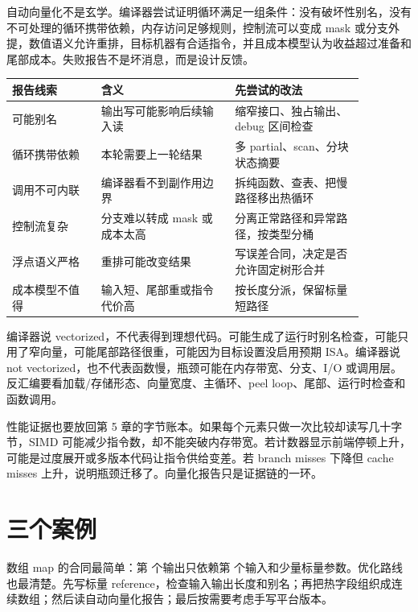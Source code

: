自动向量化不是玄学。编译器尝试证明循环满足一组条件：没有破坏性别名，没有不可处理的循环携带依赖，内存访问足够规则，控制流可以变成 mask 或分支外提，数值语义允许重排，目标机器有合适指令，并且成本模型认为收益超过准备和尾部成本。失败报告不是坏消息，而是设计反馈。

\begin{center}
\begin{tabular}{p{0.22\linewidth}p{0.33\linewidth}p{0.32\linewidth}}
\toprule
报告线索 & 含义 & 先尝试的改法 \\
\midrule
可能别名 & 输出写可能影响后续输入读 & 缩窄接口、独占输出、debug 区间检查 \\
循环携带依赖 & 本轮需要上一轮结果 & 多 partial、scan、分块状态摘要 \\
调用不可内联 & 编译器看不到副作用边界 & 拆纯函数、查表、把慢路径移出热循环 \\
控制流复杂 & 分支难以转成 mask 或成本太高 & 分离正常路径和异常路径，按类型分桶 \\
浮点语义严格 & 重排可能改变结果 & 写误差合同，决定是否允许固定树形合并 \\
成本模型不值得 & 输入短、尾部重或指令代价高 & 按长度分派，保留标量短路径 \\
\bottomrule
\end{tabular}
\end{center}

编译器说 vectorized，不代表得到理想代码。可能生成了运行时别名检查，可能只用了窄向量，可能尾部路径很重，可能因为目标设置没启用预期 ISA。编译器说 not vectorized，也不代表函数慢，瓶颈可能在内存带宽、分支、I/O 或调用层。反汇编要看加载/存储形态、向量宽度、主循环、peel loop、尾部、运行时检查和函数调用。

性能证据也要放回第 5 章的字节账本。如果每个元素只做一次比较却读写几十字节，SIMD 可能减少指令数，却不能突破内存带宽。若计数器显示前端停顿上升，可能是过度展开或多版本代码让指令供给变差。若 branch misses 下降但 cache misses 上升，说明瓶颈迁移了。向量化报告只是证据链的一环。

\section{三个案例}

数组 map 的合同最简单：第  个输出只依赖第  个输入和少量标量参数。优化路线也最清楚。先写标量 reference，检查输入输出长度和别名；再把热字段组织成连续数组；然后读自动向量化报告；最后按需要考虑手写平台版本。

